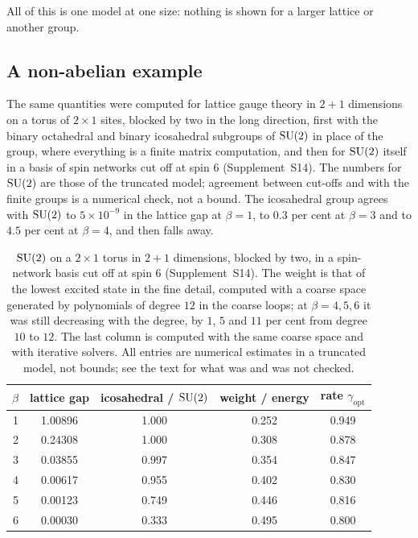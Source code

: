 All of this is one model at one size: nothing is shown for a larger lattice or another group.

\subsection*{A non-abelian example}
The same quantities were computed for lattice gauge theory in $2+1$
dimensions on a torus of $2\times1$ sites, blocked by two in the long direction, first with the binary
octahedral and binary icosahedral subgroups of $\mathrm{SU}(2)$ in place of the group, where everything is a finite
matrix computation, and then for $\mathrm{SU}(2)$ itself in a basis of spin networks cut off at spin $6$
(Supplement~S14). The numbers for $\mathrm{SU}(2)$ are those of the truncated model; agreement between cut-offs and
with the finite groups is a numerical check, not a bound. The icosahedral group agrees with $\mathrm{SU}(2)$ to
$5\times10^{-9}$ in the lattice gap at $\beta=1$, to $0.3$ per cent at $\beta=3$ and to $4.5$ per cent at
$\beta=4$, and then falls away.

\begin{table}[htbp]
\caption{$\mathrm{SU}(2)$ on a $2\times1$ torus in $2+1$ dimensions, blocked by two, in a spin-network basis cut off
at spin $6$ (Supplement~S14). The weight is that of the lowest excited state in the fine detail, computed
with a coarse space generated by polynomials of degree $12$ in the coarse loops; at $\beta=4,5,6$ it was still
decreasing with the degree, by $1$, $5$ and $11$ per cent from degree $10$ to $12$. The last column is computed
with the same coarse space and with iterative solvers. All entries are numerical estimates in a truncated
model, not bounds; see the text for what was and was not checked.}\label{tab:su2}
\centering\small
\begin{tabular}{@{}rcccc@{}}
\toprule
$\beta$ & lattice gap & icosahedral / $\mathrm{SU}(2)$ & weight / energy & rate $\gamma_{\mathrm{opt}}$ \\
\midrule
1 & 1.00896 & 1.000 & 0.252 & 0.949 \\
2 & 0.24308 & 1.000 & 0.308 & 0.878 \\
3 & 0.03855 & 0.997 & 0.354 & 0.847 \\
4 & 0.00617 & 0.955 & 0.402 & 0.830 \\
5 & 0.00123 & 0.749 & 0.446 & 0.816 \\
6 & 0.00030 & 0.333 & 0.495 & 0.800 \\
\bottomrule
\end{tabular}
\end{table}

